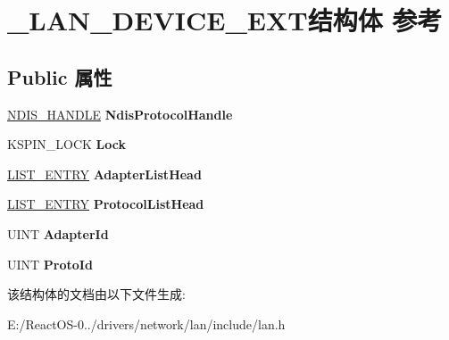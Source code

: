 \hypertarget{struct___l_a_n___d_e_v_i_c_e___e_x_t}{}\section{\+\_\+\+L\+A\+N\+\_\+\+D\+E\+V\+I\+C\+E\+\_\+\+E\+X\+T结构体 参考}
\label{struct___l_a_n___d_e_v_i_c_e___e_x_t}
\subsection*{Public 属性}
\begin{DoxyCompactItemize}
\item 
\mbox{\label{struct___l_a_n___d_e_v_i_c_e___e_x_t_ab33a4913547cb366c6150a01da93eb1f}} 
\hyperlink{interfacevoid}{N\+D\+I\+S\+\_\+\+H\+A\+N\+D\+LE} {\bfseries Ndis\+Protocol\+Handle}
\item 
\mbox{\label{struct___l_a_n___d_e_v_i_c_e___e_x_t_ac0ff4d1548672b0a38f51e81b7038a0f}} 
K\+S\+P\+I\+N\+\_\+\+L\+O\+CK {\bfseries Lock}
\item 
\mbox{\label{struct___l_a_n___d_e_v_i_c_e___e_x_t_a94907447fd9c9a1e14f1e6158cc467f4}} 
\hyperlink{struct___l_i_s_t___e_n_t_r_y}{L\+I\+S\+T\+\_\+\+E\+N\+T\+RY} {\bfseries Adapter\+List\+Head}
\item 
\mbox{\label{struct___l_a_n___d_e_v_i_c_e___e_x_t_ae608cb22e4f09368aaa42dfd985e5da9}} 
\hyperlink{struct___l_i_s_t___e_n_t_r_y}{L\+I\+S\+T\+\_\+\+E\+N\+T\+RY} {\bfseries Protocol\+List\+Head}
\item 
\mbox{\label{struct___l_a_n___d_e_v_i_c_e___e_x_t_ae50227c6baac34b1133d0cb5cb6b5a1b}} 
U\+I\+NT {\bfseries Adapter\+Id}
\item 
\mbox{\label{struct___l_a_n___d_e_v_i_c_e___e_x_t_a0a46827c63e4df49d3956ed85f567a6a}} 
U\+I\+NT {\bfseries Proto\+Id}
\end{DoxyCompactItemize}


该结构体的文档由以下文件生成\+:\begin{DoxyCompactItemize}
\item 
E\+:/\+React\+O\+S-\/0../drivers/network/lan/include/lan.\+h\end{DoxyCompactItemize}
